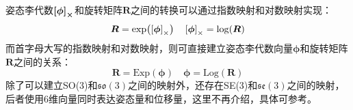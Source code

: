 姿态李代数$\boldsymbol{\left[ \boldsymbol{\phi} \right]_\times}$和旋转矩阵$\boldsymbol{R}$之间的转换可以通过指数映射和对数映射实现：
\begin{equation}
  \boldsymbol{R}=\exp(\left[ \boldsymbol{\phi} \right]_\times) \quad \left[ \boldsymbol{\phi} \right]_\times=\log(\boldsymbol{R})
\end{equation}
而首字母大写的指数映射和对数映射，则可直接建立姿态李代数向量$\boldsymbol{\phi}$和旋转矩阵$\boldsymbol{R}$之间的关系：
\begin{equation}
  \boldsymbol{R}=\mathrm{Exp}(\boldsymbol{\phi}) \quad \boldsymbol{\phi}=\mathrm{Log}(\boldsymbol{R})
\end{equation}
除了可以建立SO(3)和$\mathfrak{so}(3)$之间的映射外，还存在SE(3)和$\mathfrak{se}(3)$之间的映射，后者使用6维向量同时表达姿态量和位移量，这里不再介绍，具体可参考\cite{sola2018micro}。

